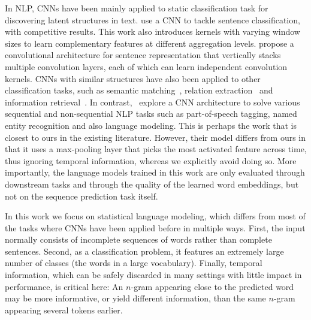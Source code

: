 In NLP, CNNs have been mainly applied to static classification task 
for discovering latent structures in text.  use a
CNN to tackle sentence classification, with competitive results. This
work also introduces kernels with varying window sizes to learn
complementary features at different aggregation
levels.  propose a convolutional
architecture for sentence representation that vertically stacks
multiple convolution layers, each of which can learn independent
convolution kernels. CNNs with similar structures have also been
applied to other classification tasks, such as semantic
matching~\cite{hu2014convolutional},
relation extraction~\cite{nguyen2015relation} and information
retrieval~\cite{shen2014latent}.  In
contrast,~ explore a CNN architecture to
solve various sequential and non-sequential NLP tasks such as
part-of-speech tagging, named entity recognition and also language
modeling. This is perhaps the work that is closest to ours in the
existing literature. However, their model differs from ours in that it
uses a max-pooling layer that picks the most activated feature across
time, thus ignoring temporal information, whereas we explicitly avoid
doing so. More importantly, the language models trained in this work are only
evaluated through downstream tasks and through the quality of the
learned word embeddings, but not on the sequence prediction task
itself.

In this work we focus on statistical language modeling, which differs
from most of the tasks where CNNs have been applied before in multiple ways. First,
the input normally consists of incomplete sequences of words rather
than complete sentences. Second, as a classification problem, it
features an extremely large number of classes (the words in a large
vocabulary). Finally, temporal information, which can be safely
discarded in many settings with little impact in performance, is
critical here: An $n$-gram appearing close to the predicted word may
be more informative, or yield different information, than the same
$n$-gram appearing several tokens earlier.